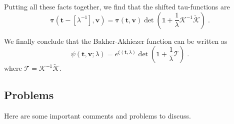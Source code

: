 \documentclass[a4paper,12pt]{amsart}
\begin{document}
Putting all these facts together, we find that the shifted
tau-functions are
\begin{equation}
  \bm{\tau}(\bm{t} - [\lambda^{-1}], \bm{v}) =
  \bm{\tau}(\bm{t}, \bm{v})
  \det \left( \mathbb{1} + \frac{1}{\lambda}
  \mathcal{K}^{-1} \check{\mathcal{K}} \right)\; .
\end{equation}

We finally conclude that the Bakher-Akhiezer function can be written as
\begin{equation}
  \psi(\bm{t},\bm{v}; \lambda) = e^{\xi(\bm{t}, \lambda)}
  \det \left( \mathbb{1} +
    \frac{1}{\lambda} \mathcal{T}
  \right)\; .
\end{equation}
where \(\mathcal{T} = \mathcal{K}^{-1} \check{\mathcal{K}}\). 









\subsection{Problems}
Here are some important comments and problems to discuss. 
\end{document}
